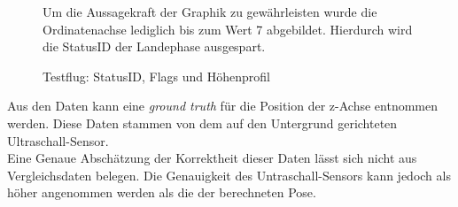 \begin{figure}[ht!]
\vspace{0.25cm}
\begin{center}
\caption{Testflug: StatusID, Flags und Höhenprofil}
\label{fig:FlightStatus}
\end{center}

\vspace{0.25cm}
Um die Aussagekraft der Graphik zu gewährleisten wurde die Ordinatenachse lediglich bis zum Wert 7 abgebildet. Hierdurch wird die StatusID der Landephase ausgespart.
\end{figure}

Aus den Daten kann eine \textit{ground truth} für die Position der z-Achse entnommen werden. Diese Daten stammen von dem auf den Untergrund gerichteten Ultraschall-Sensor.\\
Eine Genaue Abschätzung der Korrektheit dieser Daten lässt sich nicht aus Vergleichsdaten belegen. Die Genauigkeit des Untraschall-Sensors kann jedoch als höher angenommen werden als die der berechneten Pose.



